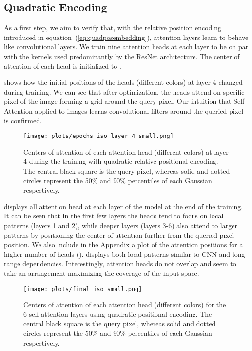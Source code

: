 \documentclass{article} \usepackage{iclr2020_conference,times}
\def\eqref#1{equation~(\ref{#1})}
\begin{document}
\vspace{-2mm}



\subsection{Quadratic Encoding}
\label{ssec:verifying_theory}
\vspace{-2mm}
As a first step, we aim to verify that, with the relative position encoding introduced in \eqref{eq:quadposembedding}, attention layers learn to behave like convolutional layers.
We train nine attention heads at each layer to be on par with the  kernels used predominantly by the ResNet architecture.
The center of attention of each head  is initialized to .

 shows how the initial positions of the heads (different colors) at layer 4 changed during training.
We can see that after optimization, the heads attend on specific pixel of the image forming a grid around the query pixel.
Our intuition that Self-Attention applied to images learns convolutional filters around the queried pixel is confirmed.


\begin{figure}
  \texttt{[image: plots/epochs\_iso\_layer\_4\_small.png]}
  \caption{Centers of attention of each attention head (different colors) at layer 4 during the training with quadratic relative positional encoding.
    The central black square is the query pixel, whereas solid and dotted circles represent the 50\% and 90\% percentiles of each Gaussian, respectively.\vspace{-3mm}}
  \label{fig:iso_during_training}
\end{figure}


 displays all attention head at each layer of the model at the end of the training.
It can be seen that in the first few layers the heads tend to focus on local patterns (layers 1 and 2), while deeper layers (layers 3-6) also attend to larger patterns by positioning the center of attention further from the queried pixel position.
We also include in the Appendix a plot of the attention positions for a higher number of heads ().
 displays both local patterns similar to CNN and long range dependencies.
Interestingly, attention heads do not overlap and seem to take an arrangement maximizing the coverage of the input space.


\begin{figure}
  \texttt{[image: plots/final\_iso\_small.png]}
  \caption{Centers of attention of each attention head (different colors) for the 6 self-attention layers using quadratic positional encoding.
  The central black square is the query pixel, whereas solid and dotted circles represent the 50\% and 90\% percentiles of each Gaussian, respectively.\vspace{-1.5mm}}
  \label{fig:iso_attention_final}
\end{figure}
\end{document}
